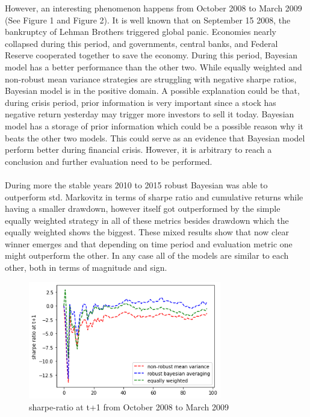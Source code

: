 However, an interesting phenomenon happens from October 2008 to March 2009 (See Figure 1 and Figure 2). It is well known that on September 15 2008, the bankruptcy of Lehman Brothers triggered global panic. Economies nearly collapsed during this period, and governments, central banks, and Federal Reserve cooperated together to save the economy. During this period, Bayesian model has a better performance than the other two. While equally weighted and non-robust mean variance strategies are struggling with negative sharpe ratios, Bayesian model is in the positive domain. A possible explanation could be that, during crisis period, prior information is very important since a stock has negative return yesterday may trigger more investors to sell it today. Bayesian model has a storage of prior information which could be a possible reason why it beats the other two models. This could serve as an evidence that Bayesian model perform better during financial crisis. However, it is arbitrary to reach a conclusion and further evaluation need to be performed.\\
\\
During more the stable years 2010 to 2015 robust Bayesian was able to outperform std. Markovitz in terms of sharpe ratio and cumulative returns while having a smaller drawdown, however itself got outperformed by the simple equally weighted strategy in all of these metrics besides drawdown which the equally weighted shows the biggest. These mixed results show that now clear winner emerges and that depending on time period and evaluation metric one might outperform the other. In any case all of the models are similar to each other, both in terms of magnitude and sign. 

\begin{figure}[h]
    \centering
    \includegraphics[width=0.75\textwidth]{Images/sharpe.png}
    \caption{sharpe-ratio at t+1 from October 2008 to March 2009}
    \label{fig:mesh1}
\end{figure}

